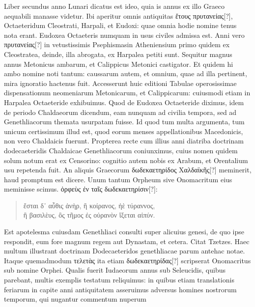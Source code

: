 Liber secundus anno Lunari dicatus est ideo, quia is annus ex illo
Graeco aequabili manasse videtur.
Ibi aperitur omnis antiquitas \textgreek{ἔτους
πρυτανείας[?]}, Octaeteridum Cleostrati, Harpali, et Eudoxi: quae omnia
hodie nomine tenus nota erant.
Eudoxea Octaeteris numquam
in usus civiles admissa est.
Anni vero \textgreek{πρυτανείας[?]} in vetustissimis Psephismasin
Atheniensium primo quidem ex Cleostratea, deinde, illa
abrogata, ex Harpalea petiti sunt.
Sequitur magnus annus Metonicus
ambarum, et Calippicus Metonici castigator.
%
Et quidem hi
ambo nomine noti tantum: caussarum autem, et omnium, quae ad
illa pertinent, mira ignoratio hactenus fuit.
Accesserunt huic editioni
Tabulae operosissimae dispensationum neomeniarum Metonicarum,
et Calippicarum: cuiusmodi etiam in Harpalea Octaeteride
exhibuimus. 
Quod de Eudoxea Octaeteride diximus, idem de
periodo Chaldaeorum dicendum, eam nunquam ad civilia tempora,
sed ad Genethliacorum themata usurpatam fuisse.
Id quod tum
multa argumenta, tum unicum certissimum illud est, quod eorum
menses appellationibus Macedonicis, non vero Chaldaicis fuerunt.
Propterea recte cum illius anni diatriba doctrinam dodecaeteridis
Chaldaicae Genethliacorum coniunximus, cuius nomen quidem
solum notum erat ex Censorino: cognitio autem nobis ex Arabum,
et Orentalium usu repetenda fuit.
An aliquis Graecorum \textgreek{δωδεκαετηρίδος Χαλδαϊκῆς[?]}
meminerit, haud promptum est dicere.
Unum tantum Orpheum sive Onomacritum eius meminisse scimus. 
\textgreek{ὀρφεὺς ἐν ταῖς δωδεκαετηρίσιν[?]:}
\begin{verse}
 \textgreek{ἔσται δ᾽ αὖθις ἀνὴρ, ἢ κοίρανος, ἠὲ τύραννος,\\
 ἢ βασιλὲυς, ὂς τῆμος ἐς οὐρανὸν ἴξεται αἰπύν}.
\end{verse}
Est apotelesma cuiusdam Genethliaci consulti super alicuius genesi,
de quo ipse respondit, eum fore magnum regem aut Dynastam, et cetera.
Citat Tzetzes. 
Haec multum illustrant doctrinam Dodecaeteridos
genethliacae parum antehac notae.
Itaque quemadmodum \textgreek{τελετὰς}
ita etiam \textgreek{δωδεκαετηρίδας[?]} scripserat Onomacritus sub nomine
Orphei.
Qualis fuerit Iudaeorum annus sub Seleucidis, quibus parebant,
multis exemplis testatum reliquimus: in quibus etiam translationis
feriarum in capite anni antiquitatem asseruimus adversus homines
nostrorum temporum, qui nugantur commentum nuperum
